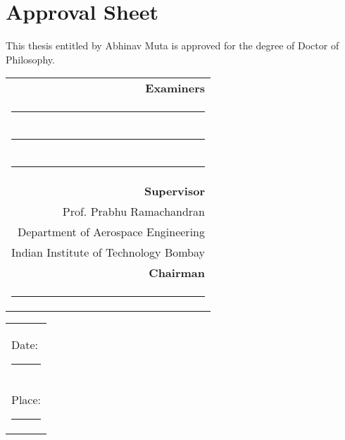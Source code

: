 \section*{\centering Approval Sheet}%
\label{approval-sheet}

This thesis entitled {\thetitle} by Abhinav Muta is approved
for the degree of Doctor of Philosophy.

\vspace{0.05\linewidth}

\begin{flushright}
\begin{tabular}{@{}r@{}}
  {\bfseries Examiners}  \vspace{0.05\linewidth} \\
  \par\noindent\rule{0.25\textwidth}{0.6pt}   \vspace{0.05\linewidth} \\
  \par\noindent\rule{0.25\textwidth}{0.6pt}   \vspace{0.05\linewidth} \\
  \par\noindent\rule{0.25\textwidth}{0.6pt}   \vspace{0.15\linewidth} \\

  {\bfseries Supervisor} \\
  Prof. Prabhu Ramachandran \\
  Department of Aerospace Engineering \\
  Indian Institute of Technology Bombay \vspace{0.15\linewidth} \\

  {\bfseries Chairman}  \vspace{0.05\linewidth} \\
  \par\noindent\rule{0.25\textwidth}{0.6pt}
\end{tabular}
\end{flushright}

\begin{flushleft}
\begin{tabular}{@{}l@{}}
  Date:\par\noindent\rule{0.2\textwidth}{0.4pt}\\
  Place:\par\noindent\rule{0.2\textwidth}{0.4pt}\\
\end{tabular}
\end{flushleft}



